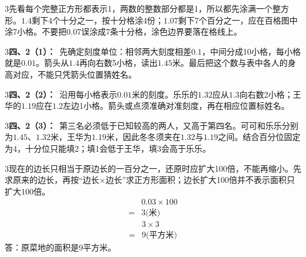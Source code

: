 \documentclass[multi=snippet,border={5bp 20bp 5bp 5bp}]{standalone}
\newenvironment{snippet}[3]{\begin{minipage}{#1bp}\color{answerred}\fontsize{#2}{#3}\selectfont\raggedright}{\end{minipage}}
\begin{document}
\begin{snippet}{505}{11.5}{14}\begin{multicols}{3}\raggedcolumns 先看每个完整正方形都表示1，两数的整数部分都是1，所以都先涂满一个整方形。\(1.4\)\allowbreak 剩下4个十分之一，按十分格涂4份；\(1.07\)\allowbreak 剩下7个百分之一，应在百格图中涂7小格。不要把\(0.07\)\allowbreak 误涂成7条十分格，涂色边界要落在格线上。\end{multicols}\end{snippet}
\begin{snippet}{505}{11.5}{14}\begin{multicols}{3}\raggedcolumns \textbf{四、2（1）：}\ 先确定刻度单位：相邻两大刻度相差\(0.1\)\allowbreak ，中间分成10小格，每小格就是\(0.01\)\allowbreak 。箭头从\(1.4\)\allowbreak 再向右数5小格，读出\(1.45\)\allowbreak 米。最后把这个数与表中各人的身高对应，不能只凭箭头位置猜姓名。\end{multicols}\end{snippet}
\begin{snippet}{505}{11.5}{14}\begin{multicols}{3}\raggedcolumns \textbf{四、2（2）：}\ 沿用每小格表示\(0.01\)\allowbreak 米的刻度。乐乐的\(1.32\)\allowbreak 应从\(1.3\)\allowbreak 向右数2小格；王华的\(1.19\)\allowbreak 应在\(1.2\)\allowbreak 左边1小格。箭头或点须准确对准刻度，再在相应位置标姓名。\end{multicols}\end{snippet}
\begin{snippet}{505}{11.5}{14}\begin{multicols}{3}\raggedcolumns \textbf{四、2（3）：}\ 第三名必须低于已知较高的两人，又高于第四名。可可和乐乐分别为\(1.45\)\allowbreak 、\(1.32\)\allowbreak 米，王华为\(1.19\)\allowbreak 米，因此冬冬须夹在\(1.32\)\allowbreak 与\(1.19\)\allowbreak 之间。结合百分位固定为4，十分位只能填2；填1会低于王华，填3会高于乐乐。\end{multicols}\end{snippet}
\begin{snippet}{505}{11.5}{14}\begin{multicols}{3}\raggedcolumns 现在的边长只相当于原边长的一百分之一，还原时应扩大100倍，不能再缩小。先求原来的边长，再按“边长×边长”求正方形面积；边长扩大100倍并不表示面积只扩大100倍。\[\begin{aligned}&0.03\times100\\={}&3\text{(米)}\end{aligned}\]\[\begin{aligned}&3\times3\\={}&9\text{(平方米)}\end{aligned}\]答：原菜地的面积是9平方米。\end{multicols}\end{snippet}
\end{document}
